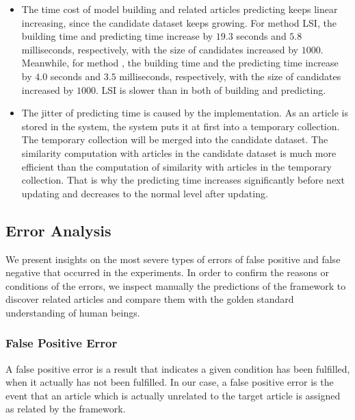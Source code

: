 \begin{itemize}
    \item The time cost of model building and related articles predicting keeps linear increasing, since the candidate dataset keeps growing. For method LSI, the building time and predicting time increase by $19.3$ seconds and $5.8$ milliseconds, respectively, with the size of candidates increased by $1000$. Meanwhile, for method \tfidf{}, the building time and the predicting time increase by $4.0$ seconds and $3.5$ milliseconds, respectively, with the size of candidates increased by $1000$. LSI is slower than \tfidf{} in both of building and predicting. 
    \item The jitter of predicting time is caused by the implementation. As an article is stored in the system, the system puts it at first into a temporary collection. The temporary collection will be merged into the candidate dataset. The similarity computation with articles in the candidate dataset is much more efficient than the computation of similarity with articles in the temporary collection. That is why the predicting time increases significantly before next updating and decreases to the normal level after updating. 
    
\end{itemize}

\bigbreak



\subsection{Error Analysis}
\label{sec:5.5}

We present insights on the most severe types of errors of false positive and false negative that occurred in the experiments. In order to confirm the reasons or conditions of the errors, we inspect manually the predictions of the framework to discover related articles and compare them with the golden standard understanding of human beings.  

\subsubsection{False Positive Error}

A false positive error is a result that indicates a given condition has been fulfilled, when it actually has not been fulfilled. In our case, a false positive error is the event that an article which is actually unrelated to the target article is assigned as related by the framework. 

